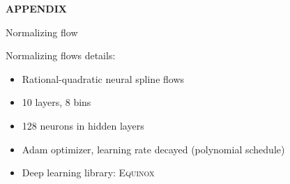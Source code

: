 \documentclass[usenames,dvipsnames,t]{beamer}
\begin{document}


\begin{frame}{}
\vfill
\centering
\textbf{APPENDIX}
\vfill
\end{frame}

\begin{frame}{Normalizing flow}

  \def\x{4mm}

  Normalizing flows details: 

  \vspace{\x}

  \begin{itemize}
    \item Rational-quadratic neural spline flows
    
    \vspace{\x}
    
    \item 10 layers, 8 bins
    
    \vspace{\x}
    
    \item 128 neurons in hidden layers
    
    \vspace{\x}
    
    \item Adam optimizer, learning rate decayed (polynomial schedule)
    
    \vspace{\x}
    
    \item Deep learning library: \textsc{Equinox}~\cite{kidger2021equinox}
  \end{itemize}
  
\end{frame}
\end{document}
